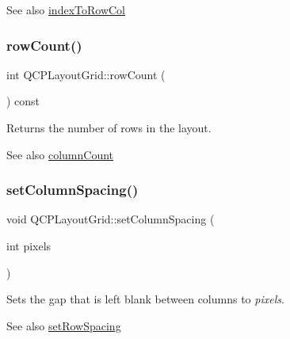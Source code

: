 \begin{DoxySeeAlso}{See also}
\hyperlink{class_q_c_p_layout_grid_a577223db920e2acb34bc1091080c76d1}{index\+To\+Row\+Col} 
\end{DoxySeeAlso}
\mbox{\label{class_q_c_p_layout_grid_a19c66fd76cbce58a8e94f33797e0c0aa}} 
\subsubsection{\texorpdfstring{row\+Count()}{rowCount()}}
{\footnotesize\ttfamily int Q\+C\+P\+Layout\+Grid\+::row\+Count (\begin{DoxyParamCaption}{ }\end{DoxyParamCaption}) const\hspace{0.3cm}{\ttfamily [inline]}}

Returns the number of rows in the layout.

\begin{DoxySeeAlso}{See also}
\hyperlink{class_q_c_p_layout_grid_a1a2962cbf45011405b64b913afa8e7a2}{column\+Count} 
\end{DoxySeeAlso}
\mbox{\label{class_q_c_p_layout_grid_a3a49272aba32bb0fddc3bb2a45a3dba0}} 
\subsubsection{\texorpdfstring{set\+Column\+Spacing()}{setColumnSpacing()}}
{\footnotesize\ttfamily void Q\+C\+P\+Layout\+Grid\+::set\+Column\+Spacing (\begin{DoxyParamCaption}\item[{int}]{pixels }\end{DoxyParamCaption})}

Sets the gap that is left blank between columns to {\itshape pixels}.

\begin{DoxySeeAlso}{See also}
\hyperlink{class_q_c_p_layout_grid_aaef2cd2d456197ee06a208793678e436}{set\+Row\+Spacing} 
\end{DoxySeeAlso}
\mbox{\label{class_q_c_p_layout_grid_ae38f31a71687b9d7ee3104852528fb50}} 
